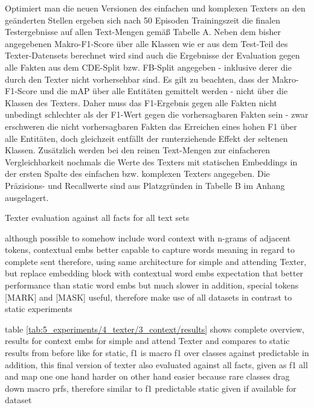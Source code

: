 Optimiert man die neuen Versionen des einfachen und komplexen Texters an den geänderten Stellen ergeben sich nach 50 Episoden Trainingszeit die finalen Testergebnisse auf allen Text-Mengen gemäß Tabelle A. Neben dem bisher angegebenen Makro-F1-Score über alle Klassen wie er aus dem Test-Teil des Texter-Datensets berechnet wird sind auch die Ergebnisse der Evaluation gegen alle Fakten aus dem CDE-Split bzw. FB-Split angegeben - inklusive derer die durch den Texter nicht vorhersehbar sind. Es gilt zu beachten, dass der Makro-F1-Score und die mAP über alle Entitäten gemittelt werden - nicht über die Klassen des Texters. Daher muss das F1-Ergebnis gegen alle Fakten nicht unbedingt schlechter als der F1-Wert gegen die vorhersagbaren Fakten sein - zwar erschweren die nicht vorhersagbaren Fakten das Erreichen eines hohen F1 über alle Entitäten, doch gleichzeit entfällt der runterziehende Effekt der seltenen Klassen. Zusätzlich werden bei den reinen Text-Mengen zur einfacheren Vergleichbarkeit nochmals die Werte des Texters mit statischen Embeddings in der ersten Spalte des einfachen bzw. komplexen Texters angegeben. Die Präzisions- und Recallwerte sind aus Platzgründen in Tabelle B im Anhang ausgelagert.

\begin{table}
    \centering
    
    \caption{Texter evaluation against all facts for all text sets}
    \label{tab:5_experiments/4_texter/3_context/results}
\end{table}

although possible to somehow include word context with n-grams of adjacent tokens, contextual embs better capable to capture words meaning in regard to complete sent
therefore, using same architecture for simple and attending Texter, but replace embedding block with contextual word embs
expectation that better performance than static word embs
but much slower
in addition, special tokens [MARK] and [MASK] useful, therefore make use of all datasets in contrast to static experiments

table \ref{tab:5_experiments/4_texter/3_context/results} shows complete overview, results for context embs for simple and attend Texter and compares to static results from before
like for static, f1 is macro f1 over classes against predictable
in addition, this final version of texter also evaluated against all facts, given as f1 all and map
one one hand harder on other hand easier because rare classes drag down macro prfs, therefore similar to f1 predictable
static given if available for dataset


